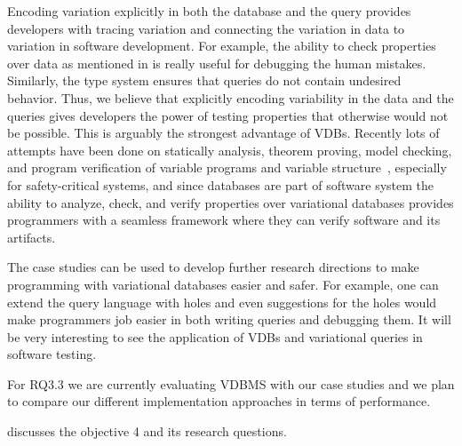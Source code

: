  
%
%
Encoding variation explicitly in both the database and the query
provides developers with tracing variation and connecting
the variation in data to variation in software development.
For example,
the ability to check properties over data as mentioned in
 is really useful for debugging the
human mistakes. Similarly, the type system ensures that 
queries do not contain undesired behavior. 
%
Thus, we believe that explicitly
encoding variability in the data and the queries gives developers the 
power of testing properties that otherwise would not be possible. 
This is arguably the strongest advantage of VDBs. Recently
lots of attempts have been done
on statically analysis, theorem proving, model checking, and program verification
of variable programs and 
variable structure~\cite{brkts20vamos, bks11fvoos, ldl07jss, tmbhvs14}, especially 
for safety-critical systems,
 and since databases are part of 
software system the ability to analyze, check, and verify 
properties over variational databases provides programmers
with a seamless framework where they can verify software
and its artifacts.
%


The case studies can be used to develop further research directions
to make programming with variational databases easier and safer.
%
%
For example, one can extend the query language with holes and even suggestions for 
the holes would make programmers job easier in both writing queries
and debugging them.
%
It will be very interesting to see the application of VDBs and 
variational queries in software testing.

For RQ3.3 we are currently evaluating VDBMS with our case studies and we plan
to compare our different implementation approaches in terms of performance.
 
 discusses the objective 4 and its research questions.
 
%
%
%
%